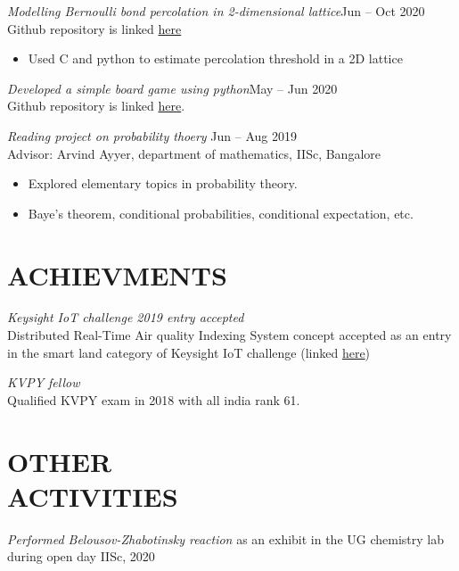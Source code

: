 \documentclass[margin, 10pt]{res} %
\begin{document}
\begin{resume}
{\sl Modelling Bernoulli bond percolation in 2-dimensional lattice}\hfill Jun -- Oct 2020\\
Github repository is linked
\href{https://github.com/AbhinavM2000/percolation\_}{here}
\begin{itemize}
	\item Used C and python to estimate percolation threshold in a 2D lattice
\end{itemize}

\smallskip

{\sl Developed a simple board game using python}\hfill May -- Jun 2020\\
Github repository is linked
\href{https://github.com/DhanusML/marble-and-hole-puzzle}{here}.

\smallskip

{\sl Reading project on probability thoery} \hfill Jun -- Aug 2019 \\
Advisor: Arvind Ayyer, department of mathematics, IISc, Bangalore
\begin{itemize} \itemsep -2pt %
	\item Explored elementary topics in probability theory.
	\item Baye's theorem, conditional probabilities,
		conditional expectation, etc.
\end{itemize}




\section{ACHIEVMENTS}

{\sl Keysight IoT challenge 2019 entry accepted}\\
Distributed Real-Time Air quality Indexing System concept accepted
as an entry in the smart land category of Keysight IoT challenge
(linked \href{https://www.iotchallengekeysight.com/2019/entries/smart-land/41-0413-102730-draqis-distributed-real-time-air-quality-indexing-system}{here})

{\sl KVPY fellow}\\
Qualified KVPY exam in 2018 with all india rank 61.




\section{OTHER \\ ACTIVITIES} 
{\it Performed Belousov-Zhabotinsky reaction} as an exhibit
in the UG chemistry lab during open day IISc, 2020


\end{resume}
\end{document}
